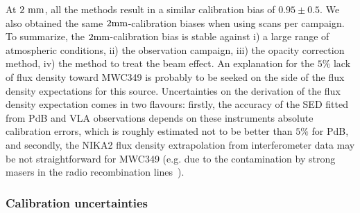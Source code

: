 At $2~\rm{mm}$, all the methods result in a similar calibration bias
of $0.95 \pm 0.5$. We also obtained the same $2\rm{mm}$-calibration
biases when using scans per campaign. To summarize, the
$2\rm{mm}$-calibration bias is stable against i) a large range of
atmospheric conditions, ii) the observation campaign, iii) the
opacity correction method, iv) the method to treat the beam
effect. An explanation for the $5\%$ lack of flux density toward
MWC349 is probably to be seeked on the side of the flux density
expectations for this source. Uncertainties on the
derivation of the flux density expectation comes in two flavours:
firstly, the accuracy of the SED fitted from PdB and VLA observations
depends on these instruments absolute calibration errors, which is
roughly estimated not to be better than $5\%$ for PdB, and secondly,
the NIKA2 flux density extrapolation from
interferometer data may be not straightforward for MWC349 (e.g. due to
the contamination by strong masers in the radio recombination lines~\cite{masingRRL}).

\subsubsection{Calibration uncertainties}

